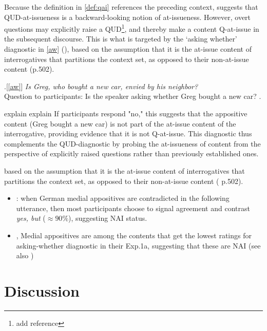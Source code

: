     Because the definition in \ref{def:qai} references the preceding context, \citet{koev_notions_2018} suggests that QUD-at-issueness is a backward-looking notion of at-issueness. However, overt questions may explicitly raise a QUD\footnote{add reference}, and thereby make a content Q-at-issue in the subsequent discourse. This is what is targeted by the `asking whether' diagnostic in \ref{aw} (\citealt{tonhauser_how_2018}), based on the assumption that it is the at-issue content of interrogatives that partitions the context set, as opposed to their non-at-issue content (p.502).

    \ex.[\ref{aw}]%
        \emph{Is Greg, who bought a new car, envied by his neighbor?}\smallskip
    \\ Question to participants: Is the speaker asking whether Greg bought a new car?
    \z.

    explain explain
    If participants respond "no," this suggests that the appositive content (Greg bought a new car) is not part of the at-issue content of the interrogative, providing evidence that it is not Q-at-issue. This diagnostic thus complements the QUD-diagnostic by probing the at-issueness of content from the perspective of explicitly raised questions rather than previously established ones.

    based on the assumption that it is the at-issue content of interrogatives that partitions the context set, as opposed to their non-at-issue content (\citealt{tonhauser_how_2018} p.502).


    \begin{itemize}

      \item \citealt{destruel_cross-linguistic_2015}: when German medial appositives are contradicted in the following utterance, then most participants choose to signal agreement and contrast \emph{yes, but} ($\approx 90\%$), suggesting NAI status.

      \item \citealt{tonhauser_how_2018}, Medial appositives are among the contents that get the lowest ratings for asking-whether diagnostic in their Exp.1a, suggesting that these are NAI (see also \citealt{solstad_cataphoric_2024})
    \end{itemize}
  


\section{Discussion}
